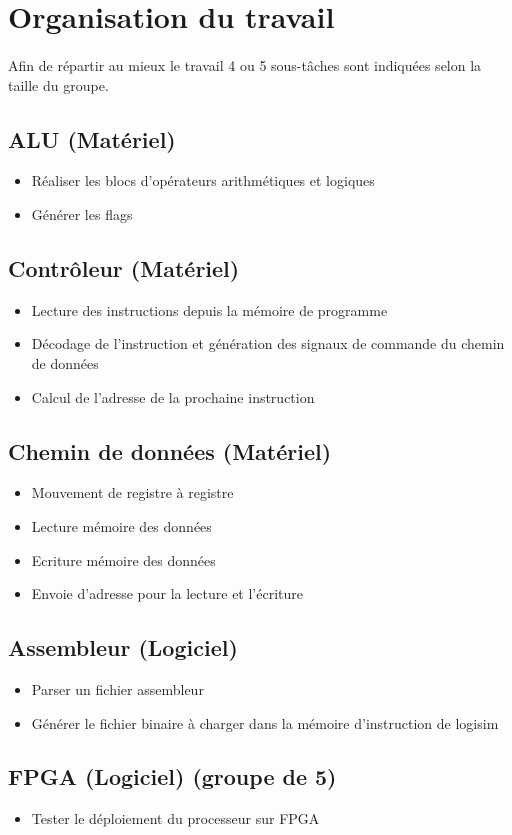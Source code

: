 \section{Organisation du travail}

\paragraph{}
	Afin de répartir au mieux le travail 4 ou 5 sous-tâches sont indiquées selon la taille du groupe.

\subsection{ALU (Matériel)}

\begin{itemize}
	\item Réaliser les blocs d'opérateurs arithmétiques et logiques
	\item Générer les flags
\end{itemize}

\subsection{Contrôleur (Matériel)}

\begin{itemize}
	\item Lecture des instructions depuis la mémoire de programme 
	\item Décodage de l'instruction et génération des signaux de commande du chemin de données
	\item Calcul de l'adresse de la prochaine instruction
\end{itemize}

\subsection{Chemin de données (Matériel)}

\begin{itemize}
	\item Mouvement de registre à registre
 	\item Lecture mémoire des données
	\item Ecriture mémoire des données
	\item Envoie d'adresse pour la lecture et l'écriture
\end{itemize}

\subsection{Assembleur (Logiciel)}

\begin{itemize}
	\item Parser un fichier assembleur 
	\item Générer le fichier binaire à charger dans la mémoire d'instruction de logisim
\end{itemize}

\subsection{FPGA (Logiciel) (groupe de 5)}

\begin{itemize}
	\item Tester le déploiement du processeur sur FPGA 
\end{itemize}
